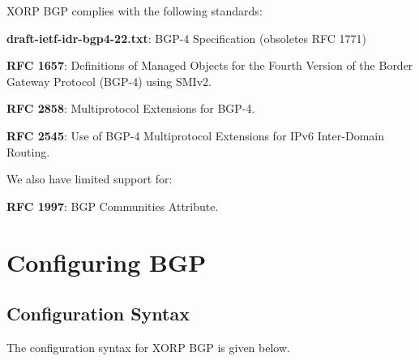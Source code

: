 XORP BGP complies with the following standards:
\begin{description}
\item{\bf draft-ietf-idr-bgp4-22.txt}: BGP-4 Specification (obsoletes RFC 1771)
\item{\bf RFC 1657}: Definitions of Managed Objects for the Fourth Version
     of the Border Gateway Protocol (BGP-4) using SMIv2.
\item{\bf RFC 2858}: Multiprotocol Extensions for BGP-4.
\item{\bf RFC 2545}: Use of BGP-4 Multiprotocol Extensions for IPv6
     Inter-Domain Routing.
\end{description}

\noindent We also have limited support for:
\begin{description}
\item{\bf RFC 1997}: BGP Communities Attribute.
\end{description}

\newpage
\section{Configuring BGP}

\subsection{Configuration Syntax}

The configuration syntax for XORP BGP is given below.


